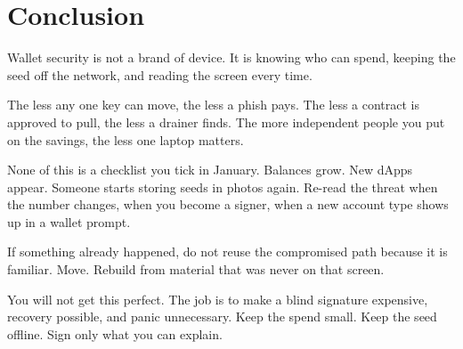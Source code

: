 \chapter{Conclusion}

Wallet security is not a brand of device. It is knowing
who can spend, keeping the seed off the network, and
reading the screen every time.

The less any one key can move, the less a phish pays.
The less a contract is approved to pull, the less a
drainer finds. The more independent people you put on
the savings, the less one laptop matters.

None of this is a checklist you tick in January. Balances
grow. New dApps appear. Someone starts storing seeds in
photos again. Re-read the threat when the number
changes, when you become a signer, when a new account
type shows up in a wallet prompt.

If something already happened, do not reuse the
compromised path because it is familiar. Move. Rebuild
from material that was never on that screen.

You will not get this perfect. The job is to make a
blind signature expensive, recovery possible, and panic
unnecessary. Keep the spend small. Keep the seed
offline. Sign only what you can explain.
